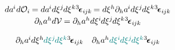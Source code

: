 \documentclass[11pt,twoside]{book}
\newcommand\permutationsparitytensor{{^3\hspace{-0.25ex}\bm{\epsilon}}\hspace{.05ex}}
\begin{document}
\[\begin{array}{c}
da^{\hspace{-0.1ex}i} \hspace{.1ex} d\mathcal{O}_i \hspace{-0.12ex}
= da^{\hspace{-0.1ex}i} d\xi^j \hspace{-0.12ex} d\xi^k \permutationsparitytensor_{i\hspace{-0.1ex}jk} \hspace{-0.2ex}
= d \xi^h \partial_h a^{\hspace{-0.1ex}i} d\xi^j \hspace{-0.12ex} d\xi^k \permutationsparitytensor_{i\hspace{-0.1ex}jk}
\\[.2em]
%
\partial_h a^{h} d\mathcal{V} \hspace{-0.1ex}
= \partial_h a^{h} d\xi^i \hspace{-0.1ex} d\xi^j \hspace{-0.12ex} d\xi^k \permutationsparitytensor_{i\hspace{-0.1ex}jk}
\end{array}\]

\[\begin{array}{c}
\partial_h a^{\hspace{-0.1ex}i} d \xi^h \hspace{-0.1ex} {\color{teal}{d\xi^j}} \hspace{-0.16ex} {\color{teal}{d\xi^k}} \permutationsparitytensor_{i\hspace{-0.1ex}jk}
\quad
\partial_h a^{h} {\color{teal}{d\xi^i}} \hspace{-0.1ex} {\color{teal}{d\xi^j}} \hspace{-0.16ex} {\color{teal}{d\xi^k}} \permutationsparitytensor_{i\hspace{-0.1ex}jk}
\end{array}\]
\end{document}
